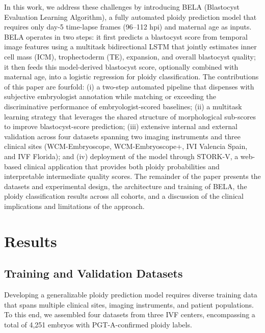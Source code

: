\documentclass[11pt]{article}
\begin{document}
In this work, we address these challenges by introducing BELA (Blastocyst Evaluation Learning Algorithm), a fully automated ploidy prediction model that requires only day-5 time-lapse frames (96--112 hpi) and maternal age as inputs. BELA operates in two steps: it first predicts a blastocyst score from temporal image features using a multitask bidirectional LSTM that jointly estimates inner cell mass (ICM), trophectoderm (TE), expansion, and overall blastocyst quality; it then feeds this model-derived blastocyst score, optionally combined with maternal age, into a logistic regression for ploidy classification. The contributions of this paper are fourfold: (i) a two-step automated pipeline that dispenses with subjective embryologist annotation while matching or exceeding the discriminative performance of embryologist-scored baselines; (ii) a multitask learning strategy that leverages the shared structure of morphological sub-scores to improve blastocyst-score prediction; (iii) extensive internal and external validation across four datasets spanning two imaging instruments and three clinical sites (WCM-Embryoscope, WCM-Embryoscope+, IVI Valencia Spain, and IVF Florida); and (iv) deployment of the model through STORK-V, a web-based clinical application that provides both ploidy probabilities and interpretable intermediate quality scores. The remainder of the paper presents the datasets and experimental design, the architecture and training of BELA, the ploidy classification results across all cohorts, and a discussion of the clinical implications and limitations of the approach.


\section{Results}

\subsection{Training and Validation Datasets}

Developing a generalizable ploidy prediction model requires diverse training data that spans multiple clinical sites, imaging instruments, and patient populations. To this end, we assembled four datasets from three IVF centers, encompassing a total of 4{,}251 embryos with PGT-A-confirmed ploidy labels.
\end{document}
